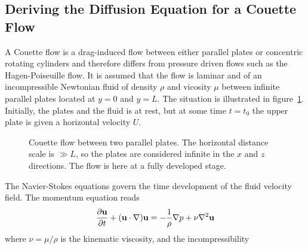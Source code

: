 \documentclass[aps,reprint]{revtex4-1}
\def\axislength{.5}
\begin{document}
\subsection{Deriving the Diffusion Equation for a Couette Flow}
A Couette flow is a drag-induced flow between either parallel plates or concentric
rotating cylinders and therefore differs from pressure driven flows such as the
Hagen-Poiseuille flow. It is assumed that the flow is laminar and of an incompressible
Newtonian fluid of density $\rho$ and vicosity $\mu$ between infinite parallel
plates located at $y = 0$ and $y = L$. The situation is illustrated in figure~\ref{fig:couette}.
Initially, the plates and the fluid is at rest, but at some time $t = t_0$
the upper plate is given a horizontal velocity $U$.
\begin{figure}[H]
  \centering
  \caption{Couette flow between two parallel plates. The horizontal distance
  scale is $\gg L$, so the plates are considered infinite in the $x$ and $z$
  directions. The flow is here at a fully developed stage.}
  \label{fig:couette}
\end{figure}
The Navier-Stokes equations govern the time development of the fluid velocity field.
The momentum equation reads
\begin{align*}
  \pdv{\vb{u}}{t} + (\vb{u} \cdot \nabla) \vb{u} = - \frac{1}{\rho} \nabla p + \nu \nabla^2 \vb{u}
\end{align*}
where $\nu = \mu/\rho$ is the kinematic viscosity, and the incompressibility
\end{document}
